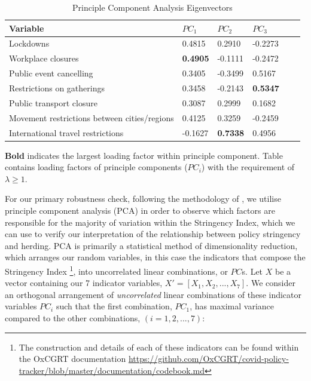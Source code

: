 \documentclass[12pt]{article}
\numberwithin{table}{section}   %
\begin{document}
\begin{table}[]
\centering
\begin{threeparttable}
\caption{Principle Component Analysis Eigenvectors \label{tab:pca}}
\begin{tabular}{l*{1}{lllll}}
\toprule
Variable                                     & $PC_1$          & $PC_2$          & $PC_3$           \\
\midrule
Lockdowns                                    & 0.4815          & 0.2910          & -0.2273         \\
Workplace closures                           & \textbf{0.4905} & -0.1111         & -0.2472         \\
Public event cancelling                      & 0.3405          & -0.3499         & 0.5167          \\
Restrictions on gatherings                   & 0.3458          & -0.2143         & \textbf{0.5347} \\
Public transport closure                     & 0.3087          & 0.2999          & 0.1682          \\
Movement restrictions between cities/regions & 0.4125          & 0.3259          & -0.2459         \\
International travel restrictions            & -0.1627         & \textbf{0.7338} & 0.4956          \\
\bottomrule
\end{tabular}
\begin{tablenotes}
\item \footnotesize \textbf{Bold} indicates the largest loading factor within principle component. Table contains loading factors of principle components ($PC_i$) with the requirement of $\lambda \geq 1$.
\end{tablenotes}
\end{threeparttable}
\end{table}

For our primary robustness check, following the methodology of \cite{kizys}, we utilise principle component analysis (PCA) in order to observe which factors are responsible for the majority of variation within the Stringency Index, which we can use to verify our interpretation of the relationship between policy stringency and herding. PCA is primarily a statistical method of dimensionality reduction, which arranges our random variables, in this case the indicators that compose the Stringency Index \footnote{The construction and details of each of these indicators can be found within the OxCGRT documentation \url{https://github.com/OxCGRT/covid-policy-tracker/blob/master/documentation/codebook.md}}, into uncorrelated linear combinations, or $PC$s. Let $X$ be a vector containing our 7 indicator variables, $X'=[X_1,X_2,...,X_7]$. We consider an orthogonal arrangement of \textit{uncorrelated} linear combinations of these indicator variables $PC_i$ such that the first combination, $PC_1$, has maximal variance compared to the other combinations, $(i=1,2,...,7)$:
\end{document}
